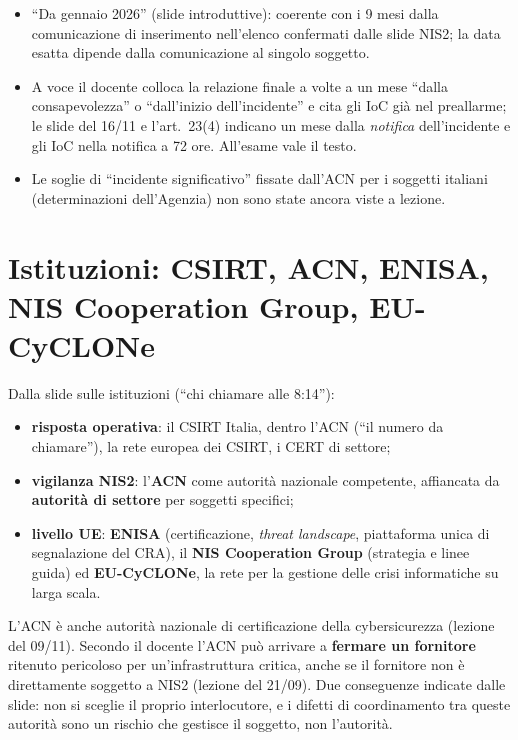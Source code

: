 \begin{verifica}
\begin{itemize}
  \item ``Da gennaio 2026'' (slide introduttive): coerente con i 9 mesi dalla comunicazione di
    inserimento nell'elenco confermati dalle slide NIS2; la data esatta dipende dalla comunicazione al
    singolo soggetto.
  \item A voce il docente colloca la relazione finale a volte a un mese ``dalla consapevolezza'' o
    ``dall'inizio dell'incidente'' e cita gli IoC già nel preallarme; le slide del 16/11 e l'art.~23(4)
    indicano un mese dalla \emph{notifica} dell'incidente e gli IoC nella notifica a 72 ore. All'esame
    vale il testo.
  \item Le soglie di ``incidente significativo'' fissate dall'ACN per i soggetti italiani (determinazioni
    dell'Agenzia) non sono state ancora viste a lezione.
\end{itemize}
\end{verifica}

\section{Istituzioni: CSIRT, ACN, ENISA, NIS Cooperation Group, EU-CyCLONe}
\label{sec:nis2-istituzioni}

Dalla slide sulle istituzioni (``chi chiamare alle 8:14''):
\begin{itemize}
  \item \textbf{risposta operativa}: il CSIRT Italia, dentro l'ACN (``il numero da chiamare''), la rete
    europea dei CSIRT, i CERT di settore;
  \item \textbf{vigilanza NIS2}: l'\textbf{ACN} come autorità nazionale competente, affiancata da
    \textbf{autorità di settore} per soggetti specifici;
  \item \textbf{livello UE}: \textbf{ENISA} (certificazione, \emph{threat landscape}, piattaforma unica
    di segnalazione del CRA), il \textbf{NIS Cooperation Group} (strategia e linee guida) ed
    \textbf{EU-CyCLONe}, la rete per la gestione delle crisi informatiche su larga scala.
\end{itemize}
L'ACN è anche autorità nazionale di certificazione della cybersicurezza (lezione del 09/11). Secondo il
docente l'ACN può arrivare a \textbf{fermare un fornitore} ritenuto pericoloso per un'infrastruttura
critica, anche se il fornitore non è direttamente soggetto a NIS2 (lezione del 21/09). Due conseguenze
indicate dalle slide: non si sceglie il proprio interlocutore, e i difetti di coordinamento tra queste
autorità sono un rischio che gestisce il soggetto, non l'autorità.

